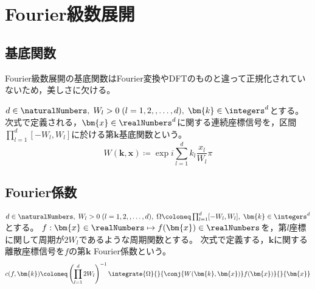 \chapter{Fourier級数展開}
    \section{基底関数}
        Fourier級数展開の基底関数はFourier変換やDFTのものと違って正規化されていないため，美しさに欠ける。
        \par
        $d\in\naturalNumbers,\;W_l>0\;(l=1,2,,\dots,d),\;\bm{k}\in\integers^d$とする。
        次式で定義される，$\bm{x}\in\realNumbers^d$に関する連続座標信号を，区間$\prod_{l=1}^d [-W_l,W_l]$に於ける第$\bm{k}$基底関数という。
        \[ W(\bm{k},\bm{x}) \coloneq \exp i\sum_{l=1}^d k_l\frac{x_l}{W_l}\pi \]

    \section{Fourier係数}
        $d\in\naturalNumbers,\;W_l>0\;(l=1,2,,\dots,d),\;\Omega\coloneq\prod_{l=1}^d [-W_l,W_l],\;\bm{k}\in\integers^d$とする。
        $f:\bm{x}\in\realNumbers \mapsto f(\bm{x})\in\realNumbers$を，第$l$座標に関して周期が$2W_l$であるような周期関数とする。
        次式で定義する，$\bm{k}$に関する離散座標信号を$f$の第$\bm{k}$ Fourier係数という。
        \[ c(f,\bm{k}) \coloneq \left(\prod_{l=1}^d 2W_l\right)^{-1}\integrate{\Omega}{}{\conj{W(\bm{k},\bm{x})}f(\bm{x})}{}{\bm{x}} \]